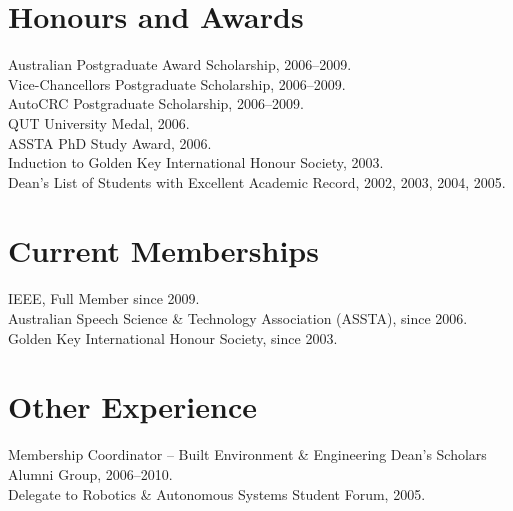 \documentclass[margin,line]{resume}
\begin{document}
\begin{resume}

\section{\sc Honours and Awards}
{ Australian Postgraduate Award Scholarship, 2006--2009.\\
\setlength{\parskip}{1ex}
Vice-Chancellors Postgraduate Scholarship, 2006--2009. \\
AutoCRC Postgraduate Scholarship, 2006--2009. \\
QUT University Medal, 2006. \\
ASSTA PhD Study Award, 2006. \\
Induction to Golden Key International Honour Society, 2003.\\
Dean's List of Students with Excellent Academic Record, 2002,
2003, 2004, 2005. }

\section{\sc Current Memberships}
{
 IEEE, Full Member since 2009.\\
 Australian Speech Science \& Technology Association (ASSTA), since 2006. \\
 Golden Key International Honour Society, since 2003.
}

\section{\sc Other Experience}
{ Membership Coordinator -- Built Environment \&
Engineering Dean's Scholars Alumni Group, 2006--2010. \\
Delegate to Robotics \& Autonomous Systems Student Forum, 2005.}


\end{resume}
\end{document}
